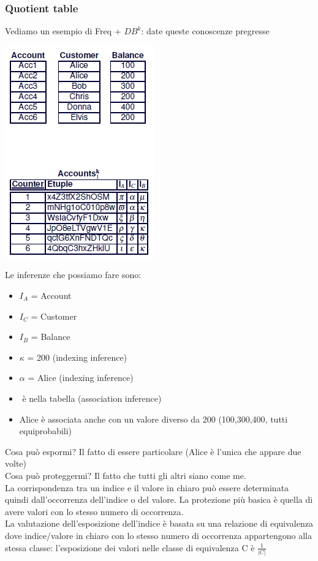 \subsubsection{Quotient table}
Vediamo un esempio di Freq + \(DB^k\): date queste conoscenze pregresse
\begin{center}
    \includegraphics[scale=0.6]{img/freqdbk.png}
\end{center}
Le inferenze che possiamo fare sono:
\begin{itemize}
    \item \(I_A\) = Account 
    \item \(I_C\) = Customer 
    \item \(I_B\) = Balance
    \item \(\kappa \) = 200 (indexing inference)
    \item \( \alpha \) = Alice (indexing inference)
    \item \(<Alice,200>\) è nella tabella (association inference)
    \item Alice è associata anche con un valore diverso da 200 (100,300,400, tutti equiprobabili)
\end{itemize}
Cosa può espormi? Il fatto di essere particolare (Alice è l'unica che appare due volte)\\
Cosa può proteggermi? Il fatto che tutti gli altri siano come me.\\
La corrispondenza tra un indice e il valore in chiaro può essere determinata quindi dall'occorrenza dell'indice o del valore. La protezione più basica è quella di avere valori con lo stesso numero di occorrenza.\\
La valutazione dell'esposizione dell'indice è basata su una relazione di equivalenza dove indice/valore in chiaro con lo stesso numero di occorrenza appartengono alla stessa classe: l'esposizione dei valori nelle classe di equivalenza C è \( \frac{1}{|C|}\)
